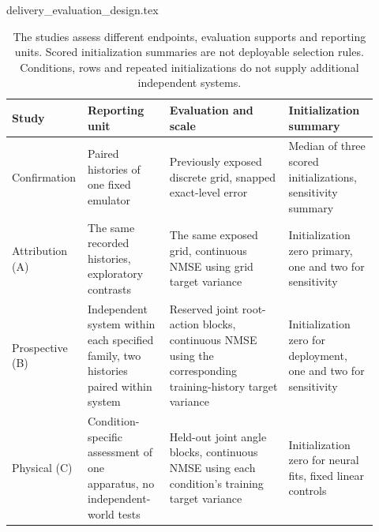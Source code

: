 \begin{filecontents*}[overwrite]{delivery_evaluation_design.tex}
\begin{table}[ht]
\centering\small
\setlength{\tabcolsep}{3pt}
\begin{tabular}{>{\raggedright\arraybackslash}p{0.14\linewidth}>{\raggedright\arraybackslash}p{0.22\linewidth}>{\raggedright\arraybackslash}p{0.32\linewidth}>{\raggedright\arraybackslash}p{0.24\linewidth}}
\toprule
Study & Reporting unit & Evaluation and scale & Initialization summary\\
\midrule
Confirmation & Paired histories of one fixed emulator & Previously exposed discrete grid, snapped exact-level error & Median of three scored initializations, sensitivity summary\\[4pt]
Attribution (A) & The same recorded histories, exploratory contrasts & The same exposed grid, continuous NMSE using grid target variance & Initialization zero primary, one and two for sensitivity\\[4pt]
Prospective (B) & Independent system within each specified family, two histories paired within system & Reserved joint root-action blocks, continuous NMSE using the corresponding training-history target variance & Initialization zero for deployment, one and two for sensitivity\\[4pt]
Physical (C) & Condition-specific assessment of one apparatus, no independent-world tests & Held-out joint angle blocks, continuous NMSE using each condition's training target variance & Initialization zero for neural fits, fixed linear controls\\
\bottomrule
\end{tabular}
\caption{The studies assess different endpoints, evaluation supports and reporting units. Scored initialization summaries are not deployable selection rules. Conditions, rows and repeated initializations do not supply additional independent systems.}
\label{tab:evaluation-design}
\end{table}
\end{filecontents*}
